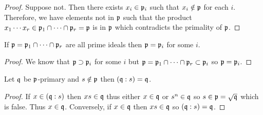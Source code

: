 \documentclass[12pt]{extarticle}
\begin{document}
\begin{proof}
Suppose not. Then there exists $x_i \in \mathfrak{p}_i$ such that $x_i \notin \mathfrak{p}$ for each $i$. Therefore, we have elements not in $\mathfrak{p}$ such that the product $x_1 \cdots x_r \in \mathfrak{p}_1 \cap \cdots \cap \mathfrak{p}_r = \mathfrak{p}$ is in $\mathfrak{p}$ which contradicts the primality of $\mathfrak{p}$. 
\end{proof}

\begin{corollary} \label{one_of_intersect}
If $\mathfrak{p} = \mathfrak{p}_1 \cap \cdots \cap \mathfrak{p}_r$ are all prime ideals then $\mathfrak{p} = \mathfrak{p}_i$ for some $i$. 
\end{corollary}

\begin{proof}
We know that $\mathfrak{p} \supset \mathfrak{p}_i$ for some $i$ but $\mathfrak{p} = \mathfrak{p}_1 \cap \cdots \cap \mathfrak{p}_r \subset \mathfrak{p}_i$ so $\mathfrak{p} = \mathfrak{p}_i$. 
\end{proof}

\begin{lemma} \label{quotient_primary}
Let $\mathfrak{q}$ be $\mathfrak{p}$-primary and $s \notin \mathfrak{p}$ then $(\mathfrak{q} : s) = \mathfrak{q}$. 
\end{lemma}

\begin{proof}
If $x \in (\mathfrak{q} : s)$ then $xs \in \mathfrak{q}$ thus either $x \in \mathfrak{q}$ or $s^n \in \mathfrak{q}$ so $s \in \mathfrak{p} = \sqrt{\mathfrak{q}}$ which is false. Thus $x \in \mathfrak{q}$. Conversely, if $x \in \mathfrak{q}$ then $xs \in \mathfrak{q}$ so $(\mathfrak{q} : s) = \mathfrak{q}$.
\end{proof}
\end{document}
